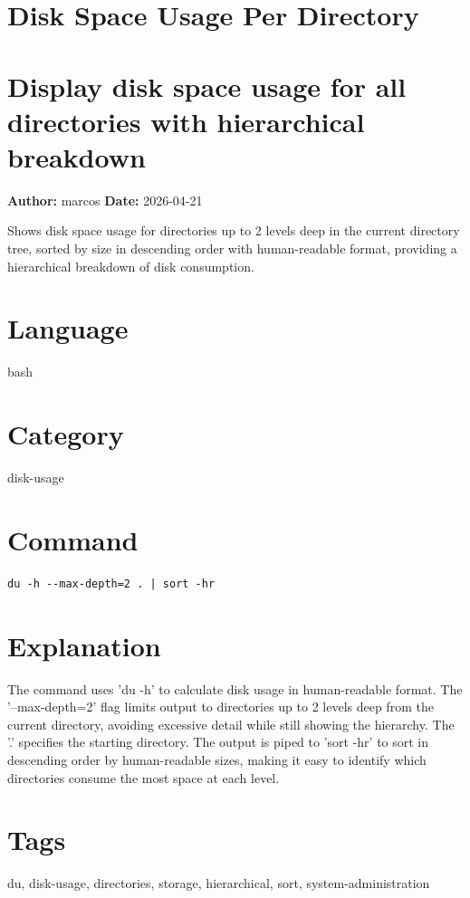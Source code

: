 \documentclass[openany]{book}
\begin{document}
\section{Disk Space Usage Per Directory}
\section*{Display disk space usage for all directories with hierarchical breakdown}
\textbf{Author:} marcos \hfill \textbf{Date:} 2026-04-21

\noindent Shows disk space usage for directories up to 2 levels deep in the current directory tree, sorted by size in descending order with human-readable format, providing a hierarchical breakdown of disk consumption.

\section*{Language}
bash

\section*{Category}
disk-usage

\section*{Command}
\begin{lstlisting}
du -h --max-depth=2 . | sort -hr
\end{lstlisting}

\section*{Explanation}
The command uses 'du -h' to calculate disk usage in human-readable format. The '--max-depth=2' flag limits output to directories up to 2 levels deep from the current directory, avoiding excessive detail while still showing the hierarchy. The '.' specifies the starting directory. The output is piped to 'sort -hr' to sort in descending order by human-readable sizes, making it easy to identify which directories consume the most space at each level.

\section*{Tags}
du, disk-usage, directories, storage, hierarchical, sort, system-administration
\end{document}
